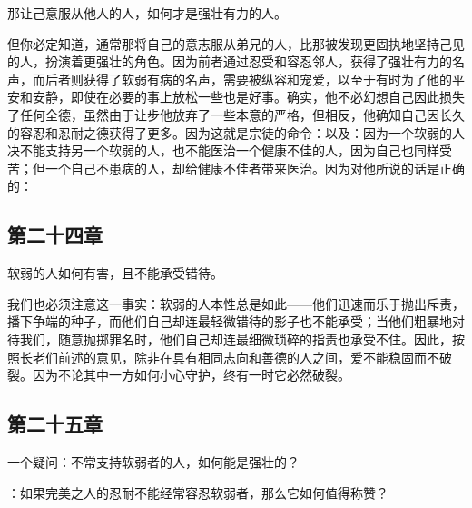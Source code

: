 那让己意服从他人的人，如何才是强壮有力的人。\par

但你必定知道，通常那将自己的意志服从弟兄的人，比那被发现更固执地坚持己见的人，扮演着更强壮的角色。因为前者通过忍受和容忍邻人，获得了强壮有力的名声，而后者则获得了软弱有病的名声，需要被纵容和宠爱，以至于有时为了他的平安和安静，即使在必要的事上放松一些也是好事。确实，他不必幻想自己因此损失了任何全德，虽然由于让步他放弃了一些本意的严格，但相反，他确知自己因长久的容忍和忍耐之德获得了更多。因为这就是宗徒的命令：以及：因为一个软弱的人决不能支持另一个软弱的人，也不能医治一个健康不佳的人，因为自己也同样受苦；但一个自己不患病的人，却给健康不佳者带来医治。因为对他所说的话是正确的：\par


\subsection{第二十四章}

软弱的人如何有害，且不能承受错待。\par

我们也必须注意这一事实：软弱的人本性总是如此——他们迅速而乐于抛出斥责，播下争端的种子，而他们自己却连最轻微错待的影子也不能承受；当他们粗暴地对待我们，随意抛掷罪名时，他们自己却连最细微琐碎的指责也承受不住。因此，按照长老们前述的意见，除非在具有相同志向和善德的人之间，爱不能稳固而不破裂。因为不论其中一方如何小心守护，终有一时它必然破裂。\par


\subsection{第二十五章}

一个疑问：不常支持软弱者的人，如何能是强壮的？\par

：如果完美之人的忍耐不能经常容忍软弱者，那么它如何值得称赞？\par


